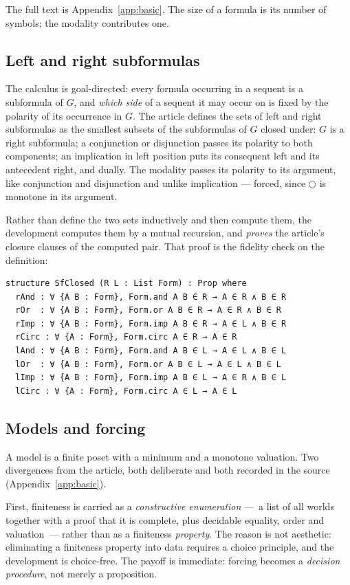 \documentclass[11pt,a4paper]{article}
\begin{document}
\noindent
The full text is Appendix~\ref{app:basic}. The size of a formula is its
number of symbols; the modality contributes one.

\subsection{Left and right subformulas}

The calculus is goal-directed: every formula occurring in a sequent is a
subformula of $G$, and \emph{which side} of a sequent it may occur on is
fixed by the polarity of its occurrence in $G$. The article defines the
sets of left and right subformulas as the smallest subsets of the
subformulas of $G$ closed under: $G$ is a right subformula; a conjunction
or disjunction passes its polarity to both components; an implication in
left position puts its consequent left and its antecedent right, and
dually. The modality passes its polarity to its argument, like conjunction
and disjunction and unlike implication --- forced, since $\bigcirc$ is
monotone in its argument.

Rather than define the two sets inductively and then compute them, the
development computes them by a mutual recursion, and \emph{proves} the
article's closure clauses of the computed pair. That proof is the fidelity
check on the definition:

\begin{lstlisting}
structure SfClosed (R L : List Form) : Prop where
  rAnd : ∀ {A B : Form}, Form.and A B ∈ R → A ∈ R ∧ B ∈ R
  rOr  : ∀ {A B : Form}, Form.or A B ∈ R → A ∈ R ∧ B ∈ R
  rImp : ∀ {A B : Form}, Form.imp A B ∈ R → A ∈ L ∧ B ∈ R
  rCirc : ∀ {A : Form}, Form.circ A ∈ R → A ∈ R
  lAnd : ∀ {A B : Form}, Form.and A B ∈ L → A ∈ L ∧ B ∈ L
  lOr  : ∀ {A B : Form}, Form.or A B ∈ L → A ∈ L ∧ B ∈ L
  lImp : ∀ {A B : Form}, Form.imp A B ∈ L → A ∈ R ∧ B ∈ L
  lCirc : ∀ {A : Form}, Form.circ A ∈ L → A ∈ L
\end{lstlisting}

\subsection{Models and forcing}

A model is a finite poset with a minimum and a monotone valuation. Two
divergences from the article, both deliberate and both recorded in the
source (Appendix~\ref{app:basic}).

First, finiteness is carried as a \emph{constructive enumeration} ---~a
list of all worlds together with a proof that it is complete, plus
decidable equality, order and valuation~--- rather than as a finiteness
\emph{property}. The reason is not aesthetic: eliminating a finiteness
property into data requires a choice principle, and the development is
choice-free. The payoff is immediate: forcing becomes a
\emph{decision procedure}, not merely a proposition.
\end{document}
